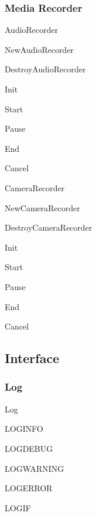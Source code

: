 \subsubsection*{Media Recorder}


\begin{DoxyItemize}
\item Audio\-Recorder
\begin{DoxyItemize}
\item New\-Audio\-Recorder
\item Destroy\-Audio\-Recorder
\item Init
\item Start
\item Pause
\item End
\item Cancel
\end{DoxyItemize}
\item Camera\-Recorder
\begin{DoxyItemize}
\item New\-Camera\-Recorder
\item Destroy\-Camera\-Recorder
\item Init
\item Start
\item Pause
\item End
\item Cancel
\end{DoxyItemize}
\end{DoxyItemize}

\subsection*{Interface}

\subsubsection*{Log}


\begin{DoxyItemize}
\item Log
\begin{DoxyItemize}
\item L\-O\-G\-I\-N\-F\-O
\item L\-O\-G\-D\-E\-B\-U\-G
\item L\-O\-G\-W\-A\-R\-N\-I\-N\-G
\item L\-O\-G\-E\-R\-R\-O\-R
\item L\-O\-G\-I\-F
\end{DoxyItemize}
\end{DoxyItemize}

